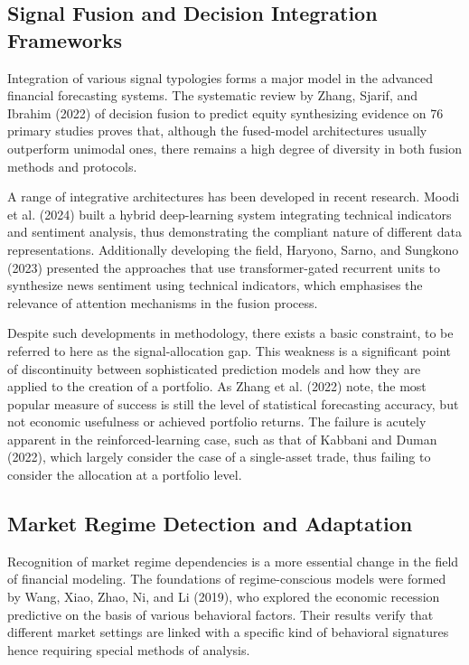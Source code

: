 \documentclass{singlecol-new}
\theoremstyle{TH}{
\newtheorem{lemma}{Lemma}
\newtheorem{theorem}[lemma]{Theorem}
\newtheorem{corrolary}[lemma]{Corrolary}
\newtheorem{conjecture}[lemma]{Conjecture}
\newtheorem{proposition}[lemma]{Proposition}
\newtheorem{claim}[lemma]{Claim}
\newtheorem{stheorem}[lemma]{Wrong Theorem}
\newtheorem{algorithm}{Algorithm}
}
\theoremstyle{THrm}{
\newtheorem{definition}{Definition}[section]
\newtheorem{question}{Question}[section]
\newtheorem{remark}{Remark}
\newtheorem{scheme}{Scheme}
}
\theoremstyle{THhit}{
\newtheorem{case}{Case}[section]
}
\begin{document}
\subsection{Signal Fusion and Decision Integration Frameworks}
Integration of various signal typologies forms a major model in the advanced financial forecasting systems. The systematic review by Zhang, Sjarif, and Ibrahim (2022) of decision fusion to predict equity synthesizing evidence on 76 primary studies proves that, although the fused-model architectures usually outperform unimodal ones, there remains a high degree of diversity in both fusion methods and protocols.

A range of integrative architectures has been developed in recent research. Moodi et al. (2024) built a hybrid deep-learning system integrating technical indicators and sentiment analysis, thus demonstrating the compliant nature of different data representations. Additionally developing the field, Haryono, Sarno, and Sungkono (2023) presented the approaches that use transformer-gated recurrent units to synthesize news sentiment using technical indicators, which emphasises the relevance of attention mechanisms in the fusion process.

Despite such developments in methodology, there exists a basic constraint, to be referred to here as the signal-allocation gap. This weakness is a significant point of discontinuity between sophisticated prediction models and how they are applied to the creation of a portfolio. As Zhang et al. (2022) note, the most popular measure of success is still the level of statistical forecasting accuracy, but not economic usefulness or achieved portfolio returns. The failure is acutely apparent in the reinforced-learning case, such as that of Kabbani and Duman (2022), which largely consider the case of a single-asset trade, thus failing to consider the allocation at a portfolio level.

\subsection{Market Regime Detection and Adaptation}

Recognition of market regime dependencies is a more essential change in the field of financial modeling. The foundations of regime-conscious models were formed by Wang, Xiao, Zhao, Ni, and Li (2019), who explored the economic recession predictive on the basis of various behavioral factors. Their results verify that different market settings are linked with a specific kind of behavioral signatures hence requiring special methods of analysis.
\end{document}
